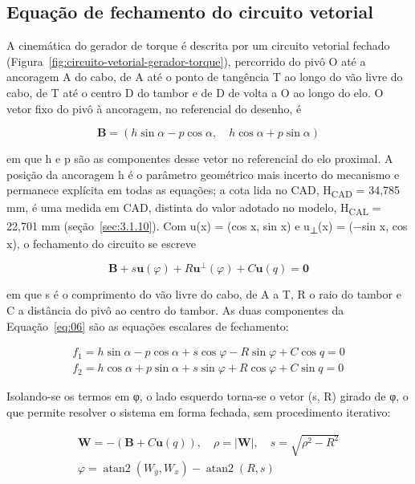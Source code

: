 \subsection{Equação de fechamento do circuito vetorial}\label{sec:3.1.4}

A cinemática do gerador de torque é descrita por um circuito vetorial fechado (Figura~\ref{fig:circuito-vetorial-gerador-torque}), percorrido do pivô O até a ancoragem A do cabo, de A até o ponto de tangência T ao longo do vão livre do cabo, de T até o centro D do tambor e de D de volta a O ao longo do elo. O vetor fixo do pivô à ancoragem, no referencial do desenho, é

\begin{equation}
  \mathbf{B} = (h\sin\alpha - p\cos\alpha,\quad h\cos\alpha + p\sin\alpha)
  \label{eq:05}
\end{equation}

em que h e p são as componentes desse vetor no referencial do elo proximal. A posição da ancoragem h é o parâmetro geométrico mais incerto do mecanismo e permanece explícita em todas as equações; a cota lida no CAD, H\textsubscript{CAD} = 34,785 mm, é uma medida em CAD, distinta do valor adotado no modelo, H\textsubscript{CAL} = 22,701 mm (seção~\ref{sec:3.1.10}). Com u(x) = (cos x, sin x) e u\textsubscript{⊥}(x) = (−sin x, cos x), o fechamento do circuito se escreve

\begin{equation}
  \mathbf{B} + s\mathbf{u}(\varphi) + R\mathbf{u}^{\bot}(\varphi) + C\mathbf{u}(q) = \mathbf{0}
  \label{eq:06}
\end{equation}

em que s é o comprimento do vão livre do cabo, de A a T, R o raio do tambor e C a distância do pivô ao centro do tambor. As duas componentes da Equação~\eqref{eq:06} são as equações escalares de fechamento:

\begin{gather}
  f_{1} = h\sin\alpha - p\cos\alpha + s\cos\varphi - R\sin\varphi + C\cos q = 0 \label{eq:07} \\
  f_{2} = h\cos\alpha + p\sin\alpha + s\sin\varphi + R\cos\varphi + C\sin q = 0 \label{eq:08}
\end{gather}

Isolando-se os termos em φ, o lado esquerdo torna-se o vetor (s, R) girado de φ, o que permite resolver o sistema em forma fechada, sem procedimento iterativo:

\begin{gather}
  \mathbf{W} = - (\mathbf{B} + C\mathbf{u}(q)),\quad\rho = \left| \mathbf{W} \right|,\quad s = \sqrt{\rho^{2} - R^{2}} \label{eq:09} \\
  \varphi = \operatorname{atan2}{(W_{y},W_{x})} - \operatorname{atan2}{(R,s)} \label{eq:10}
\end{gather}

